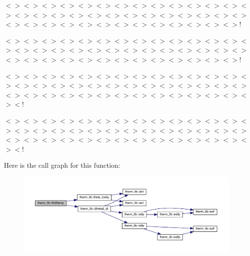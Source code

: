 $<$$>$$<$$>$$<$$>$$<$$>$$<$$>$$<$$>$$<$$>$$<$$>$$<$$>$$<$$>$$<$$>$$<$$>$$<$$>$$<$$>$$<$$>$$<$$>$$<$$>$$<$$>$$<$$>$$<$$>$$<$$>$$<$$>$$<$$>$$<$$>$$<$$>$$<$$>$$<$$>$$<$$>$$<$$>$$<$$>$$<$$>$$<$$>$$<$$>$$<$$>$$<$$>$$<$$>$$<$$>$$<$$>$$<$$>$$<$$>$!

$<$$>$$<$$>$$<$$>$$<$$>$$<$$>$$<$$>$$<$$>$$<$$>$$<$$>$$<$$>$$<$$>$$<$$>$$<$$>$$<$$>$$<$$>$$<$$>$$<$$>$$<$$>$$<$$>$$<$$>$$<$$>$$<$$>$$<$$>$$<$$>$$<$$>$$<$$>$$<$$>$$<$$>$$<$$>$$<$$>$$<$$>$$<$$>$$<$$>$$<$$>$$<$$>$$<$$>$$<$$>$$<$$>$$<$$>$$<$$>$!

$<$$>$$<$$>$$<$$>$$<$$>$$<$$>$$<$$>$$<$$>$$<$$>$$<$$>$$<$$>$$<$$>$$<$$>$$<$$>$$<$$>$$<$$>$$<$$>$$<$$>$$<$$>$$<$$>$$<$$>$$<$$>$$<$$>$$<$$>$$<$$>$$<$$>$$<$$>$$<$$>$$<$$>$$<$$>$$<$$>$$<$$>$$<$$>$$<$$>$$<$$>$$<$$>$$<$$>$$<$$>$$<$$>$$<$$>$$<$$>$$<$$>$$<$!

$<$$>$$<$$>$$<$$>$$<$$>$$<$$>$$<$$>$$<$$>$$<$$>$$<$$>$$<$$>$$<$$>$$<$$>$$<$$>$$<$$>$$<$$>$$<$$>$$<$$>$$<$$>$$<$$>$$<$$>$$<$$>$$<$$>$$<$$>$$<$$>$$<$$>$$<$$>$$<$$>$$<$$>$$<$$>$$<$$>$$<$$>$$<$$>$$<$$>$$<$$>$$<$$>$$<$$>$$<$$>$$<$$>$$<$$>$$<$$>$$<$$>$$<$! 

Here is the call graph for this function\+:\nopagebreak
\begin{figure}[H]
\begin{center}
\leavevmode
\includegraphics[width=350pt]{namespacetherm__lib_ac1f38c4afbbc3cf5a540d4e87c8b22c8_cgraph}
\end{center}
\end{figure}


\hypertarget{namespacetherm__lib_a8fda8004633d91addcf1c6004df3bd88}{}
